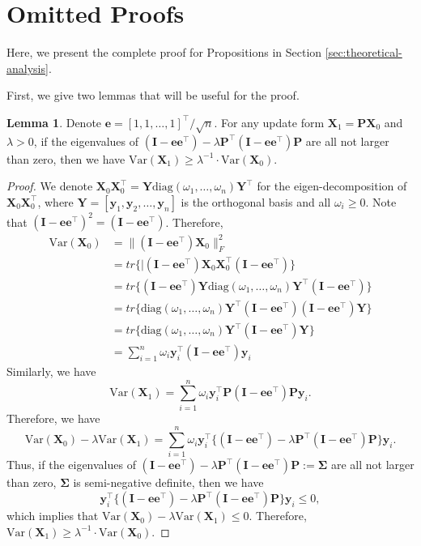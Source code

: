 \documentclass{article}
\def\ve{{\bm{e}}}
\def\vy{{\bm{y}}}
\def\mI{{\bm{I}}}
\def\mP{{\bm{P}}}
\def\mX{{\bm{X}}}
\def\mY{{\bm{Y}}}
\newcommand{\Var}{\mathrm{Var}}
\theoremstyle{definition}
\newtheorem{lemma}{Lemma}[section]
\theoremstyle{remark}
\theoremstyle{theorem}
\begin{document}
\section{Omitted Proofs} \label{appen:proof}
Here, we present the complete proof for Propositions in Section \ref{sec:theoretical-analysis}.

First, we give two lemmas that will be useful for the proof.
\begin{lemma}
    Denote $\ve=[1,1,\dots,1]^{\top}/\sqrt{n}$. For any update form $\mX_1=\mP\mX_0$ and $\lambda>0$, if the eigenvalues of $(\mI-\ve\ve^{\top})-\lambda\mP^{\top}(\mI-\ve\ve^{\top})\mP$ are all not larger than zero, then we have $\Var(\mX_1)\geq \lambda^{-1}\cdot \Var(\mX_0)$. \label{lemma1}
\end{lemma}
\begin{proof}
    We denote $\mX_0\mX_0^{\top}=\mY\text{diag}(\omega_1,\dots,\omega_n)\mY^{\top}$ for the eigen-decomposition of $\mX_0\mX_0^{\top}$, where $\mY=[\vy_1,\vy_2,\dots,\vy_n]$ is the orthogonal basis and all $\omega_i\geq 0$. Note that $(\mI-\ve\ve^{\top})^2=(\mI-\ve\ve^{\top})$. Therefore,
    \begin{equation}
    \begin{aligned}
        \Var(\mX_0)&=\|(\mI-\ve\ve^{\top})\mX_0\|_F^2\\
        &=tr\{|(\mI-\ve\ve^{\top})\mX_0\mX_0^{\top}(\mI-\ve\ve^{\top})\}\\
        &=tr\{(\mI-\ve\ve^{\top})\mY\text{diag}(\omega_1,\dots,\omega_n)\mY^{\top}(\mI-\ve\ve^{\top})\}\\
        &=tr\{\text{diag}(\omega_1,\dots,\omega_n)\mY^{\top}(\mI-\ve\ve^{\top})(\mI-\ve\ve^{\top})\mY\}\\
        &=tr\{\text{diag}(\omega_1,\dots,\omega_n)\mY^{\top}(\mI-\ve\ve^{\top})\mY\}\\
        &=\sum_{i=1}^{n}\omega_i\vy_i^{\top}(\mI-\ve\ve^{\top})\vy_i
    \end{aligned}
    \end{equation}
    Similarly, we have
    \begin{equation}
        \Var(\mX_1)=\sum_{i=1}^{n}\omega_i\vy_i^{\top}\mP(\mI-\ve\ve^{\top})\mP\vy_i.
    \end{equation}
    Therefore, we have
    \begin{equation}
        \Var(\mX_0)-\lambda\Var(\mX_1)=\sum_{i=1}^n\omega_i\vy_i^{\top}\{(\mI-\ve\ve^{\top})-\lambda\mP^{\top}(\mI-\ve\ve^{\top})\mP\}\vy_i.
    \end{equation}
    Thus, if the eigenvalues of $(\mI-\ve\ve^{\top})-\lambda\mP^{\top}(\mI-\ve\ve^{\top})\mP:=\bm{\Sigma}$ are all not larger than zero, $\bm{\Sigma}$ is semi-negative definite, then we have
    \begin{equation}
        \vy_i^{\top}\{(\mI-\ve\ve^{\top})-\lambda\mP^{\top}(\mI-\ve\ve^{\top})\mP\}\vy_i\leq 0,
    \end{equation}
    which implies that $\Var(\mX_0)-\lambda\Var(\mX_1)\leq 0$. Therefore, $\Var(\mX_1)\geq \lambda^{-1}\cdot\Var(\mX_0)$. 
\end{proof}
\end{document}

